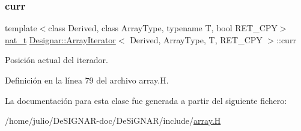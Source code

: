 \subsubsection{\texorpdfstring{curr}{curr}}
{\footnotesize\ttfamily template$<$class Derived, class Array\+Type, typename T, bool R\+E\+T\+\_\+\+C\+PY$>$ \\
\hyperlink{namespace_designar_aa72662848b9f4815e7bf31a7cf3e33d1}{nat\+\_\+t} \hyperlink{class_designar_1_1_array_iterator}{Designar\+::\+Array\+Iterator}$<$ Derived, Array\+Type, T, R\+E\+T\+\_\+\+C\+PY $>$\+::curr\hspace{0.3cm}{\ttfamily [protected]}}



Posición actual del iterador. 



Definición en la línea 79 del archivo array.\+H.



La documentación para esta clase fue generada a partir del siguiente fichero\+:\begin{DoxyCompactItemize}
\item 
/home/julio/\+De\+S\+I\+G\+N\+A\+R-\/doc/\+De\+Si\+G\+N\+A\+R/include/\hyperlink{array_8_h}{array.\+H}\end{DoxyCompactItemize}
